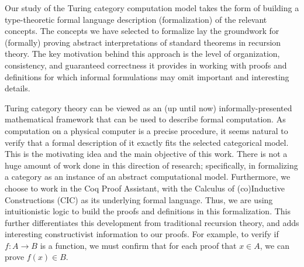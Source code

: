 \documentclass{entcs} \usepackage{entcsmacro}
\begin{document}
Our study of the Turing category computation model takes the form of building a type-theoretic formal language description (formalization) of the relevant concepts. The concepts we have selected to formalize lay the groundwork for (formally) proving abstract interpretations of standard theorems in recursion theory. The key motivation behind  this approach is the level of organization, consistency, and guaranteed correctness it provides in working with proofs and definitions for which informal formulations may omit important and interesting details. 


Turing category theory can be viewed as an (up until now) informally-presented mathematical framework that can be used to describe formal computation. As computation on a physical computer is a precise procedure, it seems natural to verify that a formal description of it exactly fits the selected categorical model. This is the motivating idea and the main objective of this work. There is not a huge amount of work done in this direction of research; specifically, in formalizing a category as an instance of an abstract computational model. 
Furthermore, we choose to work in the Coq Proof Assistant, with the
Calculus of (co)\-In\-duc\-tive Constructions (CIC) as its underlying
formal language.
Thus, we are using intuitionistic logic to build the proofs and definitions in this formalization.  This further differentiates this development from traditional recursion theory, and adds interesting constructivist information to our proofs. For example, to verify if $f: A\rightarrow B$ is a function, we must confirm that for each proof that $x\in A$, we can prove $f(x)\in B$.

\end{document}
